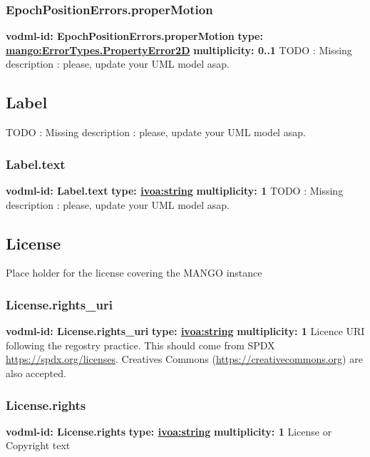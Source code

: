     \subsubsection{EpochPositionErrors.properMotion}
      \textbf{vodml-id: EpochPositionErrors.properMotion} \newline
      \textbf{type: \hyperref[sect:ErrorTypes.PropertyError2D]{mango:ErrorTypes.PropertyError2D}} \newline
      \textbf{multiplicity: 0..1} \newline 
      TODO : Missing description : please, update your UML model asap.

  \subsection{Label}
  \label{sect:Label}
    TODO : Missing description : please, update your UML model asap.

    \subsubsection{Label.text}
      \textbf{vodml-id: Label.text} \newline
      \textbf{type: \hyperref[sect:ivoa]{ivoa:string}} \newline
      \textbf{multiplicity: 1} \newline 
      TODO : Missing description : please, update your UML model asap.

  \subsection{License}
  \label{sect:License}
    Place holder for the license covering the MANGO instance

    \subsubsection{License.rights_uri}
      \textbf{vodml-id: License.rights_uri} \newline
      \textbf{type: \hyperref[sect:ivoa]{ivoa:string}} \newline
      \textbf{multiplicity: 1} \newline 
      Licence URI following the regostry practice. This should come from SPDX \url{https://spdx.org/licenses}. Creatives Commons (\url{https://creativecommons.org}) are also accepted.

    \subsubsection{License.rights}
      \textbf{vodml-id: License.rights} \newline
      \textbf{type: \hyperref[sect:ivoa]{ivoa:string}} \newline
      \textbf{multiplicity: 1} \newline 
      License or Copyright text

